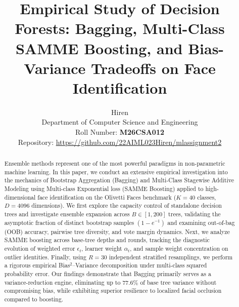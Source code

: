 \documentclass[10pt,twocolumn,letterpaper]{article}
\begin{document}
\title{Empirical Study of Decision Forests: Bagging, Multi-Class SAMME Boosting, and Bias-Variance Tradeoffs on Face Identification}

\author{
Hiren\\
Department of Computer Science and Engineering\\
Roll Number: \textbf{M26CSA012} \\
Repository: \url{https://github.com/22AIML023Hiren/mlassignment2}
}

\maketitle

\begin{abstract}
Ensemble methods represent one of the most powerful paradigms in non-parametric machine learning. In this paper, we conduct an extensive empirical investigation into the mechanics of Bootstrap Aggregation (Bagging) and Multi-Class Stagewise Additive Modeling using Multi-class Exponential loss (SAMME Boosting) applied to high-dimensional face identification on the Olivetti Faces benchmark ($K=40$ classes, $D=4096$ dimensions). We first explore the capacity control of standalone decision trees and investigate ensemble expansion across $B \in [1, 200]$ trees, validating the asymptotic fraction of distinct bootstrap samples $(1-e^{-1})$ and examining out-of-bag (OOB) accuracy, pairwise tree diversity, and vote margin dynamics. Next, we analyze SAMME boosting across base-tree depths and rounds, tracking the diagnostic evolution of weighted error $\epsilon_t$, learner weight $\alpha_t$, and sample weight concentration on outlier identities. Finally, using $R=30$ independent stratified resamplings, we perform a rigorous empirical Bias$^2$--Variance decomposition under multi-class squared probability error. Our findings demonstrate that Bagging primarily serves as a variance-reduction engine, eliminating up to $77.6\%$ of base tree variance without compromising bias, while exhibiting superior resilience to localized facial occlusion compared to boosting.
\end{abstract}

\end{document}
